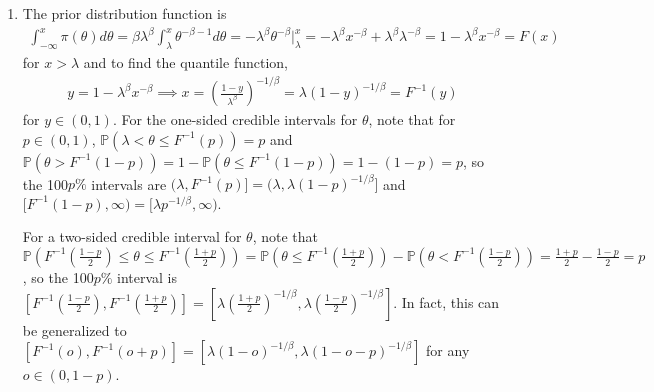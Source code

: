 \documentclass[12pt]{article}
\newcommand{\p}{\mathbb{P}}
\begin{document}
\begin{enumerate}
    \begin{enumerate}
        \item The prior distribution function is \begin{align*}
            \int_{-\infty}^x \pi(\theta) d\theta = \beta\lambda^\beta \int_\lambda^x \theta^{-\beta-1} d\theta = -\lambda^\beta \theta^{-\beta} |_\lambda^x = - \lambda^\beta x^{-\beta} + \lambda^\beta \lambda^{-\beta} = 1 - \lambda^\beta x^{-\beta} = F(x)
        \end{align*} for $x>\lambda$ and to find the quantile function, \begin{align*}
            y = 1 - \lambda^\beta x^{-\beta} \implies x = (\frac{1-y}{\lambda^\beta})^{-1/\beta} = \lambda (1-y)^{-1/\beta} = F^{-1}(y)
        \end{align*} for $y\in(0,1)$. For the one-sided credible intervals for $\theta$, note that for $p \in (0,1)$, $\p(\lambda < \theta \leq F^{-1}(p)) = p$ and $\p(\theta > F^{-1}(1-p)) = 1-\p(\theta \leq F^{-1}(1-p)) = 1-(1-p) = p$, so the 100$p\%$ intervals are $(\lambda, F^{-1}(p)] = (\lambda, \lambda(1-p)^{-1/\beta}]$ and $[F^{-1}(1-p), \infty) = [\lambda p^{-1/\beta}, \infty)$.

        For a two-sided credible interval for $\theta$, note that $\p(F^{-1}(\frac{1-p}{2}) \leq \theta \leq F^{-1}(\frac{1+p}{2})) = \p(\theta \leq F^{-1}(\frac{1+p}{2})) - \p(\theta < F^{-1}(\frac{1-p}{2})) = \frac{1+p}{2} - \frac{1-p}{2} = p$, so the 100$p\%$ interval is $[F^{-1}(\frac{1-p}{2}), F^{-1}(\frac{1+p}{2})] = [\lambda(\frac{1+p}{2})^{-1/\beta}, \lambda(\frac{1-p}{2})^{-1/\beta}]$. In fact, this can be generalized to $[F^{-1}(o), F^{-1}(o+p)] = [\lambda(1-o)^{-1/\beta}, \lambda(1-o-p)^{-1/\beta}]$ for any $o \in (0,1-p)$.


\end{enumerate}
\end{enumerate}
\end{document}
